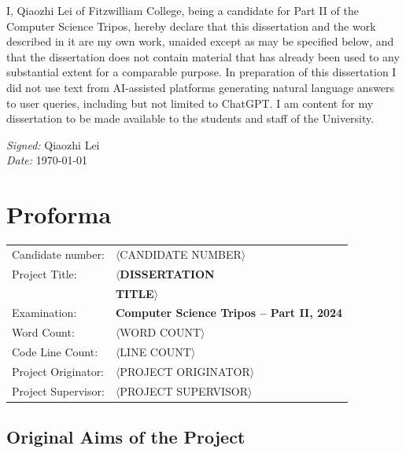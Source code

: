 \documentclass[12pt,a4paper,twoside,openright]{report}
\begin{document}
I, Qiaozhi Lei of Fitzwilliam College, being a candidate for Part II of the Computer Science Tripos, hereby declare that this dissertation and the work described in it are my own work, unaided except as may be specified below, and that the dissertation does not contain material that has already been used to any substantial extent for a comparable purpose. In preparation of this dissertation I did not use text from AI-assisted platforms generating natural language answers to user queries, including but not limited to ChatGPT. I am content for my dissertation to be made available to the students and staff of the University.

\emph{Signed:} Qiaozhi Lei\\
\emph{Date:} \today

\chapter*{Proforma}
 {\large
  \begin{tabular}{ll}
	  Candidate number:   & \(\langle\)CANDIDATE NUMBER\(\rangle\)                                        \\
	  Project Title:      & \bf \(\langle\)DISSERTATION          \\ & \bf TITLE\(\rangle\) \\
	  Examination:        & \bf Computer Science Tripos -- Part II, 2024 \\
	  Word Count:         & \(\langle\)WORD COUNT\(\rangle\)\footnotemark[1]                        \\
	  Code Line Count:    & \(\langle\)LINE COUNT\(\rangle\)\footnotemark[2]                         \\
	  Project Originator: & \(\langle\)PROJECT ORIGINATOR\(\rangle\)         \\
	  Project Supervisor: & \(\langle\)PROJECT SUPERVISOR\(\rangle\)                 \\
  \end{tabular}
 }

\section*{Original Aims of the Project}
\end{document}
